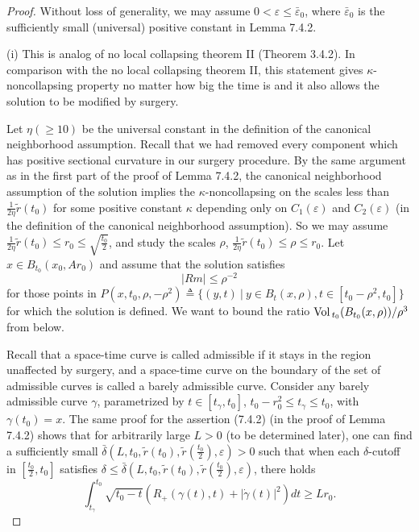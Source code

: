 \begin{proof}
Without loss of generality, we may assume $0<\varepsilon \leq
\bar{\varepsilon}_0$, where $\bar{\varepsilon}_0$ is the
sufficiently small (universal) positive constant in Lemma 7.4.2.

\medskip
(i) This is analog of no local collapsing theorem II (Theorem
3.4.2). In comparison with the no local collapsing theorem II,
this statement gives $\kappa$-noncollapsing property no matter how
big the time is and it also allows the solution to be modified by
surgery.

Let $\eta (\geq 10)$ be the universal constant in the definition
of the canonical neighborhood assumption. Recall that we had
removed every component which has positive sectional curvature in
our surgery procedure. By the same argument as in the first part
of the proof of Lemma 7.4.2, the canonical neighborhood assumption
of the solution implies the $\kappa$-noncollapsing on the scales
less than $\frac{1}{2\eta}\widetilde{r}(t_0)$ for some positive
constant $\kappa$ depending only on $C_1(\varepsilon)$ and
$C_2(\varepsilon)$ (in the definition of the canonical
neighborhood assumption). So we may assume
$\frac{1}{2\eta}\widetilde{r}(t_0)\leq r_0\leq
\sqrt{\frac{t_0}{2}}$, and study the scales $\rho$,
$\frac{1}{2\eta}\widetilde{r}(t_0)\leq \rho\leq r_0$. Let $x\in
B_{t_0}(x_0,Ar_0)$ and assume that the solution satisfies
$$
|Rm|\leq \rho^{-2}
$$
for those points in $P(x,t_0,\rho,-\rho^{2})\triangleq\{(y,t)\ |\
y\in B_t(x,\rho),t\in[t_0-\rho^2,t_0]\}$ for which the solution is
defined. We want to bound the ratio
${\rm Vol}\,_{t_0}(B_{t_0}(x,\rho))/\rho^3$ from below.

Recall that a space-time curve is called admissible if it stays in
the region unaffected by surgery, and a space-time curve on the
boundary of the set of admissible curves is called a barely
admissible curve. Consider any barely admissible curve $\gamma$,
parametrized by $t\in[t_{\gamma},t_0]$, $t_0-r^2_0\leq
t_{\gamma}\leq t_0$, with $\gamma(t_0)=x$. The same proof for the
assertion (7.4.2) (in the proof of Lemma 7.4.2) shows that for
arbitrarily large $L>0$ (to be determined later), one can find a
sufficiently small
$\bar{\delta}(L,t_0,\widetilde{r}(t_0),\widetilde{r}
(\frac{t_0}{2}),\varepsilon)>0$ such that when each
$\delta$-cutoff in $[\frac{t_0}{2},t_0]$ satisfies $\delta \leq
\bar{\delta}(L,t_0,\widetilde{r}(t_0),\widetilde{r}
(\frac{t_0}{2}),\varepsilon)$, there holds \begin{equation}
\int^{t_0}_{t_{\gamma}}\sqrt{t_0-t}(R_+(\gamma(t),t)
+|\dot{\gamma}(t)|^2)dt\geq Lr_0. %
\end{equation}


\end{proof}
